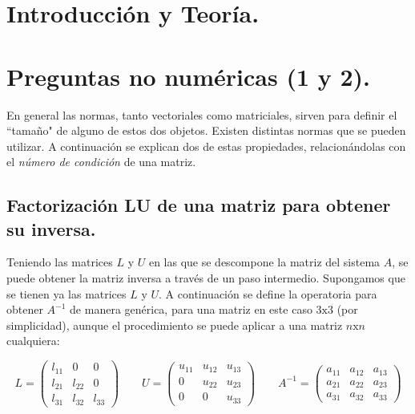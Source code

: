 \documentclass[12pt, notitlepage]{article}
\begin{document}
\clearpage
\setcounter{page}{1}

\section{Introducción y Teoría.}



\newpage

\section{Preguntas no numéricas (1 y 2).}
En general las normas, tanto vectoriales como matriciales, sirven para definir el ``tamaño" de alguno de estos dos objetos. Existen distintas normas que se pueden utilizar. A continuación se explican dos de estas propiedades, relacionándolas con el \textit{número de condición} de una matriz.

\subsection{Factorización LU de una matriz para obtener su inversa.}

Teniendo las matrices $L$ y $U$ en las que se descompone la matriz del sistema $A$, se puede obtener la matriz inversa a través de un paso intermedio. Supongamos que se tienen ya las matrices $L$ y $U$. A continuación se define la operatoria para obtener $A^{-1}$ de manera genérica, para una matriz en este caso $3\text{x}3$ (por simplicidad), aunque el procedimiento se puede aplicar a una matriz $n\text{x}n$ cualquiera:

\begin{equation*}
L = \begin{pmatrix}
l_{11} & 0 & 0 \\
l_{21} & l_{22} & 0 \\
l_{31} & l_{32} & l_{33}
\end{pmatrix} \qquad U=\begin{pmatrix}
u_{11} & u_{12} & u_{13} \\
0 & u_{22} & u_{23} \\
0 & 0 & u_{33}
\end{pmatrix} \qquad A^{-1} = \begin{pmatrix}
a_{11} & a_{12} & a_{13} \\
a_{21} & a_{22} & a_{23} \\
a_{31} & a_{32} & a_{33}
\end{pmatrix}
\end{equation*}
\end{document}
